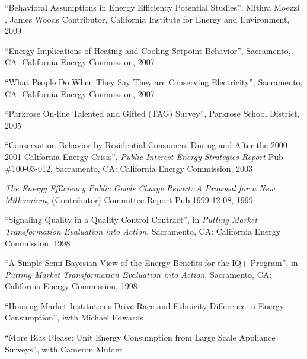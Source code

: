 \documentclass[Computer Science]{vita}
\begin{document}
\begin{vita}
\begin{Publications}
\begin{Unrefereed Public Reports}
    \item ``Behavioral Assumptions in Energy Efficiency Potential
      Studies'', Mithra Moezzi , James Woods Contributor, California
      Institute for Energy and Environment, 2009

    \item ``Energy Implications of Heating and Cooling Setpoint
      Behavior'', Sacramento, CA: California Energy Commission, 2007

    \item ``What People Do When They Say They are Conserving
      Electricity'', Sacramento, CA: California Energy Commission,
      2007

    \item ``Parkrose On-line Talented and Gifted (TAG) Survey'',
      Parkrose School District, 2005

    \item ``Conservation Behavior by Residential Consumers During and
      After the 2000-2001 California Energy Crisis'', \emph{Public
        Interest Energy Strategies Report} Pub \#100-03-012,
      Sacramento, CA: California Energy Commission, 2003

    \item \emph{The Energy Efficiency Public Goods Charge Report: A
        Proposal for a New Millennium}, (Contributor) Committee Report
      Pub 1999-12-08, 1999
	
    \item ``Signaling Quality in a Quality Control Contract'', in
      \emph{Putting Market Transformation Evaluation into Action},
      Sacramento, CA: California Energy Commission, 1998
	
    \item ``A Simple Semi-Bayesian View of the Energy Benefits for the
      IQ+ Program'', in \emph{Putting Market Transformation Evaluation
        into Action}, Sacramento, CA: California Energy Commission,
      1998
	
    \end{Unrefereed Public Reports}
  
    \begin{Work in progress}
    
\item ``Housing Market Institutions Drive Race and Ethnicity Difference in Energy Consumption'', iwth Michael Edwards

\item ``More Bias Please: Unit Energy Consumption from Large Scale Appliance Surveys'', with Cameron Mulder


\end{Work in progress}
\end{Publications}
\end{vita}
\end{document}
